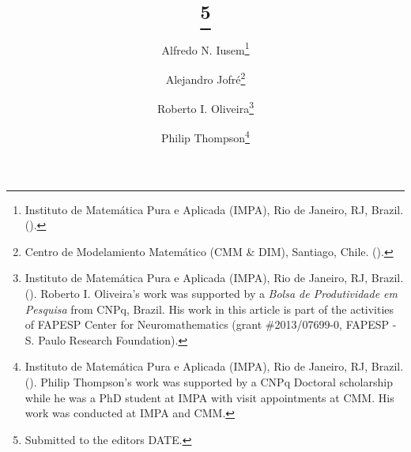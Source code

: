 
\title{{\TheTitle}\thanks{Submitted to the editors DATE.
}}

\author{
Alfredo N. Iusem\thanks{Instituto de Matem\'atica Pura e Aplicada (IMPA), 
Rio de Janeiro, RJ, Brazil.
().}
\and
Alejandro Jofr\'e\thanks{Centro de Modelamiento Matem\'atico (CMM \& DIM), 
Santiago, Chile.
().}
\and
Roberto I. Oliveira\thanks{Instituto de Matem\'atica Pura e Aplicada (IMPA), 
Rio de Janeiro, RJ, Brazil.
(). Roberto I. Oliveira's work was supported by a {\em Bolsa de Produtividade em Pesquisa} from CNPq, Brazil. His work in this article is part of the activities of FAPESP Center for Neuromathematics (grant \#2013/07699-0, FAPESP - S. Paulo Research Foundation).}
\and
Philip Thompson\thanks{Instituto de Matem\'atica Pura e Aplicada (IMPA), 
Rio de Janeiro, RJ, Brazil.
(). Philip Thompson's work was supported by a CNPq Doctoral scholarship while he was a PhD student at IMPA with visit appointments at CMM. His work was conducted at IMPA and CMM.}
}



